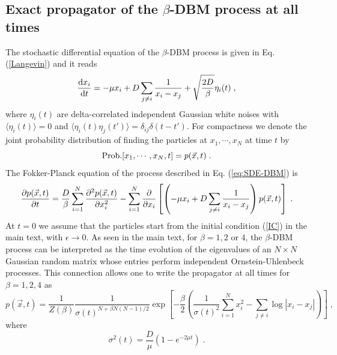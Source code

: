 \documentclass[onecolumn,superscriptaddress,
 amsmath,amssymb,
 aps,
 prd,
]{revtex4-1}
\begin{document}
\begin{appendix}


\section{Exact propagator of the $\beta$-DBM process at all times}\label{App}

\noindent The stochastic differential equation of the $\beta$-DBM process is given in Eq. (\ref{Langevin}) and it reads
%
\begin{equation} \label{eq:SDE-DBM}
\dv{x_i}{t} = -\mu x_i + D \sum_{j \neq i} \frac{1}{x_i - x_j} + \sqrt{\frac{2 D}{\beta}} \eta_i(t) \;,
\end{equation}
where $\eta_i(t)$ are delta-correlated independent Gaussian white noises with $\langle \eta_i(t) \rangle = 0$ and $\langle \eta_i(t)\eta_j(t') \rangle = \delta_{ij} \delta(t - t')$. For compactness we denote the joint probability distribution of finding the particles at $x_1, \cdots, x_N$ at time $t$ by
\begin{equation} \label{eq:def-propagator}
{\rm Prob.}[x_1, \cdots, x_N, t] = p(\vec{x}, t) \;.
\end{equation}
The Fokker-Planck equation of the process described in Eq. (\ref{eq:SDE-DBM}) is 
\begin{equation} \label{eq:FP-DBM}
\pdv{p(\vec{x}, t)}{t} = \frac{D}{\beta} \sum_{i = 1}^N \pdv[2]{p(\vec{x}, t)}{x_i} - \sum_{i = 1}^N \pdv{}{x_i} \left[\left(-\mu x_i + D \sum_{j \neq i} \frac{1}{x_i - x_j} \right) p(\vec{x}, t) \right] \;.
\end{equation}
At $t=0$ we assume that the particles start from the initial condition (\ref{IC}) in the main text, with $\epsilon \to 0$. 
As seen in the main text, for $\beta = 1, 2$ or $4$, the $\beta$-DBM process can be interpreted as the time evolution of the eigenvalues of an $N \times N$ Gaussian random matrix whose entries perform independent Ornstein-Uhlenbeck processes. This connection allows one to write the propagator at all times for $\beta = 1,2,4$ as \cite{F10} 
%
\begin{equation} \label{eq:ansatz-propagator}
p(\vec{x}, t) = \frac{1}{Z(\beta)} \frac{1}{\sigma(t)^{N + \beta N(N-1)/2}} \exp[ -\frac{\beta}{2}\left( \frac{1}{\sigma(t)^2} \sum_{i = 1}^N x_i^2 - \sum_{j \neq i} \log|x_i - x_j| \right) ] \;,
\end{equation}
where 
\begin{equation}
\sigma^2(t) = \frac{D}{\mu} \left(1 - e^{-2 \mu t}\right) \;.
\end{equation}


\end{appendix}
\end{document}
